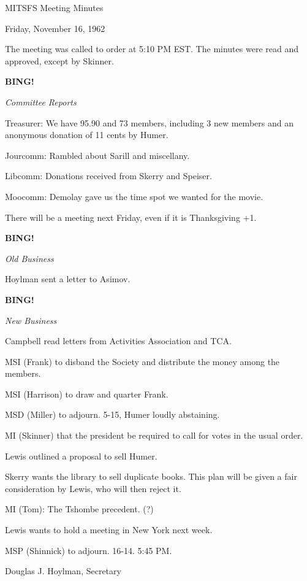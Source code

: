 \documentclass[12pt]{article}
\newcommand{\bing}{{\bf BING!} }
\newcommand{\goto}[1]{\bing \vskip 12pt \centerline{{\em{#1}}}}
\begin{document}
\begin{center}

MITSFS Meeting Minutes

Friday, November 16, 1962

\end{center}
 
\vspace{12pt}

\setlength{\parskip}{6pt}

\noindent
The meeting was called to order at 5:10 PM EST. The minutes were read and approved, except by Skinner.

\goto{Committee Reports}

Treasurer: We have 95.90 and 73 members, including 3 new members and an anonymous donation of 11 cents by Humer.

Jourcomm: Rambled about Sarill and miscellany.

Libcomm: Donations received from Skerry and Speiser.

Moocomm: Demolay gave us the time spot we wanted for the movie.

There will be a meeting next Friday, even if it is Thanksgiving +1.

\goto{Old Business}

Hoylman sent a letter to Asimov.

\goto{New Business}

Campbell read letters from Activities Association and TCA.

MSI (Frank) to disband the Society and distribute the money among the members.

MSI (Harrison) to draw and quarter Frank.

MSD (Miller) to adjourn. 5-15, Humer loudly abstaining.

MI (Skinner) that the president be required to call for votes in the usual order.

Lewis outlined a proposal to sell Humer.

Skerry wants the library to sell duplicate books. This plan will be given a fair consideration by Lewis, who will then reject it.

MI (Tom): The Tshombe precedent. (?)

Lewis wants to hold a meeting in New York next week.

MSP (Shinnick) to adjourn. 16-14. 5:45 PM.

\vspace{12pt}

\centerline{Douglas J. Hoylman, Secretary}
\end{document}
